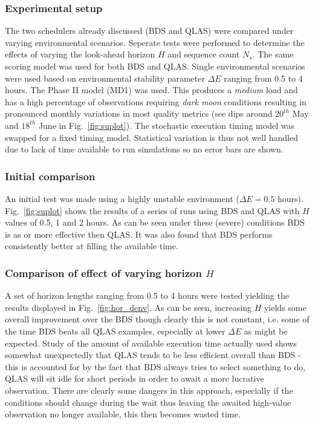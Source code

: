 \documentclass[12pt,a4paper]{article}
\begin{document}
{\subsubsection{Experimental setup}
The two schedulers already discussed (BDS and QLAS) were compared under varying environmental scenarios. Seperate tests were performed to determine the effects of varying the look-ahead horizon $H$ and sequence count $N_s$.
The same scoring model was used for both BDS and QLAS. Single environmental scenarios were used based on environmental stability parameter $\Delta E$ ranging from  0.5 to 4 hours. The Phase II model (MD1) was used. This produces a \emph{medium} load and has a high percentage of observations requiring \emph{dark moon} conditions resulting in pronounced monthly variations in most quality metrics (see dips around $20^{th}$ May and $18^{th}$ June in Fig.~\ref{fig:suplot}). The stochastic execution timing model was swapped for a fixed timing model. Statistical variation is thus not well handled due to lack of time available to run simulations so no error bars are shown.

\subsubsection{Initial comparison}
 An initial test was made using a highly unstable environment ($\Delta E = 0.5$ hours). Fig.~\ref{fig:suplot} shows the results of a series of runs using BDS and QLAS with $H$ values of 0.5, 1 and 2 hours. As can be seen under these (severe) conditions BDS is as or more effective then QLAS. It was also found that BDS performs consistently better at filling the available time. 

\subsubsection{Comparison of effect of varying horizon $H$}
A set of horizon lengths ranging from 0.5 to 4 hours were tested yielding the results displayed in Fig.~\ref{fig:hor_denv}. As can be seen, increasing $H$ yields some overall improvement over the BDS though clearly this is not constant, i.e. some of the time BDS beats all QLAS examples, especially at lower $\Delta E$ as might be expected. Study of the amount of available execution time actually used shows somewhat unexpectedly that QLAS tends to be less efficient overall than BDS - this is accounted for by the fact that BDS always tries to select something to do, QLAS will sit idle for short periods in order to await a more lucrative observation. There are clearly some dangers in this approach, especially if the conditions should change during the wait thus leaving the awaited high-value observation no longer available, this then becomes wasted time. 



}
\end{document}
